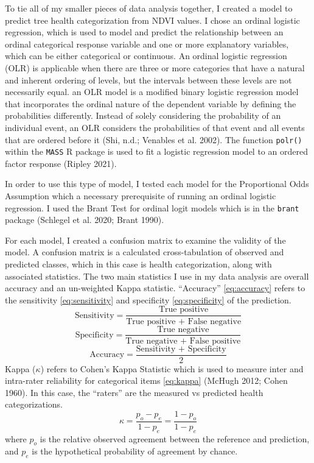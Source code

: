 \documentclass[12pt,twoside]{reedthesis}
\begin{document}
To tie all of my smaller pieces of data analysis together, I created a
model to predict tree health categorization from NDVI values. I chose an
ordinal logistic regression, which is used to model and predict the
relationship between an ordinal categorical response variable and one or
more explanatory variables, which can be either categorical or
continuous. An ordinal logistic regression (OLR) is applicable when
there are three or more categories that have a natural and inherent
ordering of levels, but the intervals between these levels are not
necessarily equal. an OLR model is a modified binary logistic regression
model that incorporates the ordinal nature of the dependent variable by
defining the probabilities differently. Instead of solely considering
the probability of an individual event, an OLR considers the
probabilities of that event and all events that are ordered before it
(Shi, n.d.; Venables et al. 2002). The function \texttt{polr()} within the \texttt{MASS} R package is
used to fit a logistic regression model to an ordered factor response
(Ripley 2021).

In order to use this type of model, I tested each model for the
Proportional Odds Assumption which a necessary prerequisite of running
an ordinal logistic regression. I used the Brant Test for ordinal logit
models which is in the \texttt{brant} package (Schlegel et al. 2020; Brant 1990).

For each model, I created a confusion matrix to examine the validity of
the model. A confusion matrix is a calculated cross-tabulation of
observed and predicted classes, which in this case is health
categorization, along with associated statistics. The two main
statistics I use in my data analysis are overall accuracy and an
un-weighted Kappa statistic. ``Accuracy'' \eqref{eq:accuracy} refers to the
sensitivity \eqref{eq:sensitivity} and specificity \eqref{eq:specificity}
of the prediction.
\begin{equation}
  \textrm{Sensitivity}= \frac{\textrm{True positive}}{\textrm{True positive + False negative}}
  \label{eq:sensitivity}
\end{equation}
\begin{equation}
  \textrm{Specificity}= \frac{\textrm{True negative}}{\textrm{True negative + False positive}}
  \label{eq:specificity}
\end{equation}
\begin{equation}
  \textrm{Accuracy}= \frac{\textrm{Sensitivity + Specificity}}{2}
  \label{eq:accuracy}
\end{equation}
Kappa (\(\kappa\)) refers to Cohen's Kappa Statistic which is used to
measure inter and intra-rater reliability for categorical items
\eqref{eq:kappa} (McHugh 2012; Cohen 1960). In this case, the ``raters''
are the measured vs predicted health categorizations.
\begin{equation}
  \kappa = \frac{p_o - p_e}{1 - p_e} = \frac{1 - p_o}{1 - p_e}
  \label{eq:kappa}
\end{equation}
where \(p_o\) is the relative observed agreement between the reference and
prediction, and \(p_e\) is the hypothetical probability of agreement by
chance.
\end{document}
